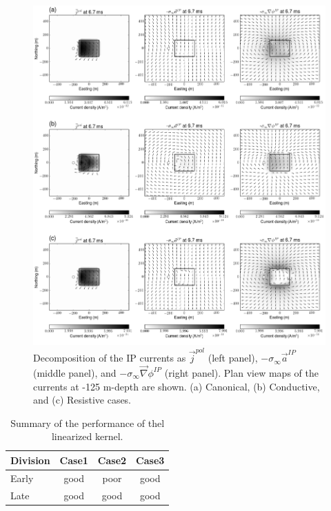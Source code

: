 \documentclass[a4paper, 11pt]{article}
\newcommand{\grad}{\vec \nabla}
\newcommand{\siginf}{\sigma_\infty}
\renewcommand {\j}  { {\vec j} }
\begin{document}
\begin{figure}[htb]
  \centering
  \includegraphics[width=1.\textwidth]{figures/IPcurrents_helmholtz.png}
  \caption{Decomposition of the IP currents as $\j^{pol}$ (left panel), $-\siginf\vec{a}^{IP}$ (middle panel), and $-\siginf\grad\phi^{IP}$ (right panel). Plan view maps of the currents at -125 m-depth are shown. (a) Canonical, (b) Conductive, and (c) Resistive cases. }
  \label{F:IPcurrents_helmholtz}
\end{figure}

\begin{table}
 \caption{Summary of the performance of thel linearized kernel.}
 \label{table:summary}
 \centering
 \begin{tabular}{@{}lccc}
  Division & Case1 & Case2 & Case3  \\
  \hline
  Early & good & poor & good  \\
  Late & good & good & good \\
 \end{tabular}
\end{table}
\clearpage

\end{document}

